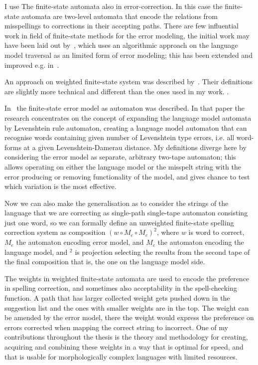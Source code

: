 \documentclass[officiallayout]{unihelcompling}
\begin{document}
I use The finite-state automata also in error-correction. In this case the
finite-state automata are two-level automata that encode the relations from
misspellings to corrections in their accepting paths. There are few influential
work in field of finite-state methods for the error modeling, the initial work
may have been laid out by~\citet{oflazer1996errortolerant}, which uses an
algorithmic approach on the language model traversal as an limited form of
error modeling; this has been extended and improved e.g. 
in~\citet{hulden2009fast}. 

An approach on weighted finite-state system was described
by~\citet{mohri2003edit}. Their definitions are slightly more technical and
different than the ones used in my work. .

In~\citet{agata2002typographical} the finite-state error model as automaton was
described. In that paper the research concentrates on the concept of expanding
the language model automata by Levenshtein rule automaton, creating a language
model automaton that can recognise words containing given number of Levenshtein
type errors, i.e. all word-forms at a given Levenshtein-Damerau distance. My
definitions diverge here by considering the error model as separate, arbitrary
two-tape automaton; this allows operating on either the language model or the
misspelt string with the error producing or removing functionality of the
model, and gives chance to test which variation is the most effective. 

Now we can also make the generalisation as to consider the strings of the
language that we are correcting as single-path single-tape automaton consisting
just one word, so we can formally define an unweighted finite-state spelling
correction system as composition $(w \circ M_e \circ M_c)^2$, where $w$ is word
to correct, $M_e$ the automaton encoding error model, and $M_c$ the automaton
encoding the language model, and $^2$ is projection selecting the results from
the second tape of the final composition that is, the one on the language
model side.

The weights in weighted finite-state automata are used to encode the preference
in spelling correction, and sometimes also acceptability in the spell-checking
function. A path that has larger collected weight gets pushed down in the
suggestion list and the ones with smaller weights are in the top. The weight
can be amended by the error model, there the weight would express the
preference on errors corrected when mapping the correct string to incorrect.
One of my contributions throughout the thesis is the
theory and methodology for creating, acquiring and combining these weights in a
way that is optimal for speed, and that is usable for morphologically complex
languages with limited resources.
\end{document}
